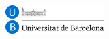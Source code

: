 \documentclass[
		twoside,openright,titlepage,numbers=noenddot,manychapters,
		headinclude,%
                footinclude=false,cleardoublepage=empty,
                BCOR=5mm,
		fontsize=11pt, %
                 enabledeprecatedfontcommands]{scrreprt}
\begin{document}
\begin{titlepage}
\begin{addmargin}[0cm]{0cm}



\begin{center}

\includegraphics[width=3.8cm]{figures/logos/marca_pos_rgb.jpg} \\%




\vfill

\large

\hfill

\vspace*{5cm}

\begingroup
\color{Blue}\spacedallcaps{\myTitle} %
\endgroup


\vfill




\vfill





\end{center}
\end{addmargin}
\end{titlepage}
\end{document}
